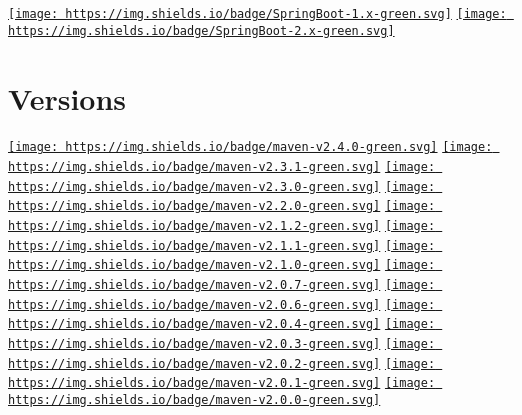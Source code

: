 \documentclass[
]{book}
\begin{document}
\href{https://spring.io/projects/spring-boot/}{\texttt{[image: https://img.shields.io/badge/SpringBoot-1.x-green.svg]}}
\href{https://spring.io/projects/spring-boot/}{\texttt{[image: https://img.shields.io/badge/SpringBoot-2.x-green.svg]}}

\hypertarget{versions}{%
\section{Versions}\label{versions}}

\href{https://search.maven.org/search?q=g:com.github.fangjinuo.sqlhelper\%20AND\%20v:2.4.0}{\texttt{[image: https://img.shields.io/badge/maven-v2.4.0-green.svg]}}
\href{https://search.maven.org/search?q=g:com.github.fangjinuo.sqlhelper\%20AND\%20v:2.3.1}{\texttt{[image: https://img.shields.io/badge/maven-v2.3.1-green.svg]}}
\href{https://search.maven.org/search?q=g:com.github.fangjinuo.sqlhelper\%20AND\%20v:2.3.0}{\texttt{[image: https://img.shields.io/badge/maven-v2.3.0-green.svg]}}
\href{https://search.maven.org/search?q=g:com.github.fangjinuo.sqlhelper\%20AND\%20v:2.2.0}{\texttt{[image: https://img.shields.io/badge/maven-v2.2.0-green.svg]}}
\href{https://search.maven.org/search?q=g:com.github.fangjinuo.sqlhelper\%20AND\%20v:2.1.2}{\texttt{[image: https://img.shields.io/badge/maven-v2.1.2-green.svg]}}
\href{https://search.maven.org/search?q=g:com.github.fangjinuo.sqlhelper\%20AND\%20v:2.1.1}{\texttt{[image: https://img.shields.io/badge/maven-v2.1.1-green.svg]}}
\href{https://search.maven.org/search?q=g:com.github.fangjinuo.sqlhelper\%20AND\%20v:2.1.0}{\texttt{[image: https://img.shields.io/badge/maven-v2.1.0-green.svg]}}
\href{https://search.maven.org/search?q=g:com.github.fangjinuo.sqlhelper\%20AND\%20v:2.0.7}{\texttt{[image: https://img.shields.io/badge/maven-v2.0.7-green.svg]}}
\href{https://search.maven.org/search?q=g:com.github.fangjinuo.sqlhelper\%20AND\%20v:2.0.6}{\texttt{[image: https://img.shields.io/badge/maven-v2.0.6-green.svg]}}
\href{https://search.maven.org/search?q=g:com.github.fangjinuo.sqlhelper\%20AND\%20v:2.0.4}{\texttt{[image: https://img.shields.io/badge/maven-v2.0.4-green.svg]}}
\href{https://search.maven.org/search?q=g:com.github.fangjinuo.sqlhelper\%20AND\%20v:2.0.3}{\texttt{[image: https://img.shields.io/badge/maven-v2.0.3-green.svg]}}
\href{https://search.maven.org/search?q=g:com.github.fangjinuo.sqlhelper\%20AND\%20v:2.0.2}{\texttt{[image: https://img.shields.io/badge/maven-v2.0.2-green.svg]}}
\href{https://search.maven.org/search?q=g:com.github.fangjinuo.sqlhelper\%20AND\%20v:2.0.1}{\texttt{[image: https://img.shields.io/badge/maven-v2.0.1-green.svg]}}
\href{https://search.maven.org/search?q=g:com.github.fangjinuo.sqlhelper\%20AND\%20v:2.0.0}{\texttt{[image: https://img.shields.io/badge/maven-v2.0.0-green.svg]}}
\end{document}
